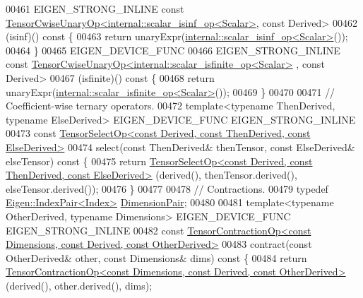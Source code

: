 \begin{DoxyCode}
00461     EIGEN\_STRONG\_INLINE \textcolor{keyword}{const} 
      \hyperlink{class_eigen_1_1_tensor_cwise_unary_op}{TensorCwiseUnaryOp<internal::scalar\_isinf\_op<Scalar>}, \textcolor{keyword}{
      const} Derived>
00462     (isinf)()\textcolor{keyword}{ const }\{
00463       \textcolor{keywordflow}{return} unaryExpr(\hyperlink{struct_eigen_1_1internal_1_1scalar__isinf__op}{internal::scalar\_isinf\_op<Scalar>}());
00464     \}
00465     EIGEN\_DEVICE\_FUNC
00466     EIGEN\_STRONG\_INLINE \textcolor{keyword}{const} 
      \hyperlink{class_eigen_1_1_tensor_cwise_unary_op}{TensorCwiseUnaryOp<internal::scalar\_isfinite\_op<Scalar>}
      , \textcolor{keyword}{const} Derived>
00467     (isfinite)()\textcolor{keyword}{ const }\{
00468       \textcolor{keywordflow}{return} unaryExpr(\hyperlink{struct_eigen_1_1internal_1_1scalar__isfinite__op}{internal::scalar\_isfinite\_op<Scalar>}());
00469     \}
00470 
00471     \textcolor{comment}{// Coefficient-wise ternary operators.}
00472     \textcolor{keyword}{template}<\textcolor{keyword}{typename} ThenDerived, \textcolor{keyword}{typename} ElseDerived> EIGEN\_DEVICE\_FUNC EIGEN\_STRONG\_INLINE
00473     \textcolor{keyword}{const} \hyperlink{class_eigen_1_1_tensor_select_op}{TensorSelectOp<const Derived, const ThenDerived, const ElseDerived>}
00474     select(\textcolor{keyword}{const} ThenDerived& thenTensor, \textcolor{keyword}{const} ElseDerived& elseTensor)\textcolor{keyword}{ const }\{
00475       \textcolor{keywordflow}{return} \hyperlink{class_eigen_1_1_tensor_select_op}{TensorSelectOp<const Derived, const ThenDerived, const ElseDerived>}
      (derived(), thenTensor.derived(), elseTensor.derived());
00476     \}
00477 
00478     \textcolor{comment}{// Contractions.}
00479     \textcolor{keyword}{typedef} \hyperlink{struct_eigen_1_1_index_pair}{Eigen::IndexPair<Index>} \hyperlink{struct_eigen_1_1_index_pair}{DimensionPair};
00480 
00481     \textcolor{keyword}{template}<\textcolor{keyword}{typename} OtherDerived, \textcolor{keyword}{typename} Dimensions> EIGEN\_DEVICE\_FUNC EIGEN\_STRONG\_INLINE
00482     \textcolor{keyword}{const} 
      \hyperlink{class_eigen_1_1_tensor_contraction_op}{TensorContractionOp<const Dimensions, const Derived, const OtherDerived>}
00483     contract(\textcolor{keyword}{const} OtherDerived& other, \textcolor{keyword}{const} Dimensions& dims)\textcolor{keyword}{ const }\{
00484       \textcolor{keywordflow}{return} 
      \hyperlink{class_eigen_1_1_tensor_contraction_op}{TensorContractionOp<const Dimensions, const Derived, const OtherDerived>}
      (derived(), other.derived(), dims);

\end{DoxyCode}
